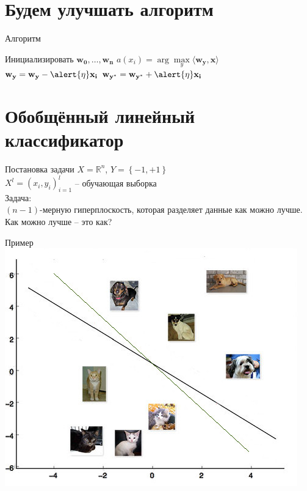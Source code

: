 \documentclass[10pt]{beamer}
\begin{document}
\section{Будем улучшать алгоритм}

\begin{frame}{Алгоритм}
	\begin{algorithmic}[1]
            \State Инициализировать ${\mathbf{w_0}, \dots, \mathbf{w_n}}$
                 \State $a(x_i) = \arg\max\limits_{y} \langle \mathbf{w_y}, \mathbf{x} \rangle$                 
                   \State $\mathbf{w_y} = \mathbf{w_y} - \alert{\eta} \mathbf{x_i}$
                   \State $\mathbf{w_{y^{*}}} = \mathbf{w_{y^{*}}} + \alert{\eta} \mathbf{x_i}$
                 \EndIf  
               \EndFor
           	\EndRepeat
        \EndFunction
    \end{algorithmic}
\end{frame}

\section{Обобщённый линейный классификатор}

\begin{frame}{Постановка задачи}
  $X = \mathbb{R}^n$, ${Y = \left\{ -1, + 1\right\}}$\\
  ${X^l = (x_i, y_i)_{i = 1}^l}$ -- обучающая выборка\\
  \bigbreak
  \alert{Задача}:\\
  $(n-1)$-мерную гиперплоскость, которая разделяет данные \alert{как можно лучше}.
  \bigbreak \pause
  Как можно лучше -- это как?
\end{frame}

\begin{frame}{Пример}
  \centering
  \includegraphics[width=0.9 \textwidth, keepaspectratio]{images/catdog}
\end{frame}
\end{document}
